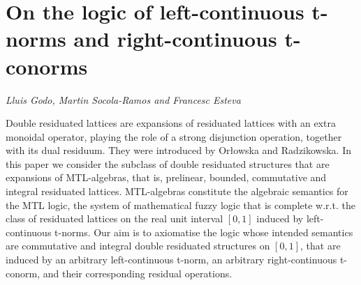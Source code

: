 \documentclass[../booklet.tex]{subfiles}
\begin{document}
\section[On the logic of left-continuous t-norms and right-continuous t-conorms. {\it Lluis Godo, Martin Socola-Ramos and Francesc Esteva}]{On the logic of left-continuous t-norms and right-continuous t-conorms}
  

\begin{center}
  {\it Lluis Godo, Martin Socola-Ramos and Francesc Esteva}
\end{center}

\vskip 0.8cm


Double residuated lattices are expansions of residuated lattices with an extra monoidal operator, playing the role of a strong disjunction operation, together with its dual residuum. They were introduced by Or{\l}owska and Radzikowska. In this paper we consider the subclass of double residuated structures that are expansions  of MTL-algebras, that is, prelinear, bounded, commutative and integral residuated lattices. MTL-algebras constitute the algebraic semantics for the MTL logic, the system of mathematical fuzzy logic that is complete w.r.t. the class of residuated lattices on the real unit interval $[0,1]$ induced by left-continuous t-norms. Our aim is to axiomatise the logic whose intended semantics are commutative and integral double residuated structures on $[0, 1]$, that are induced by an arbitrary left-continuous t-norm, an arbitrary right-continuous t-conorm, and their corresponding residual operations.
\end{document}
